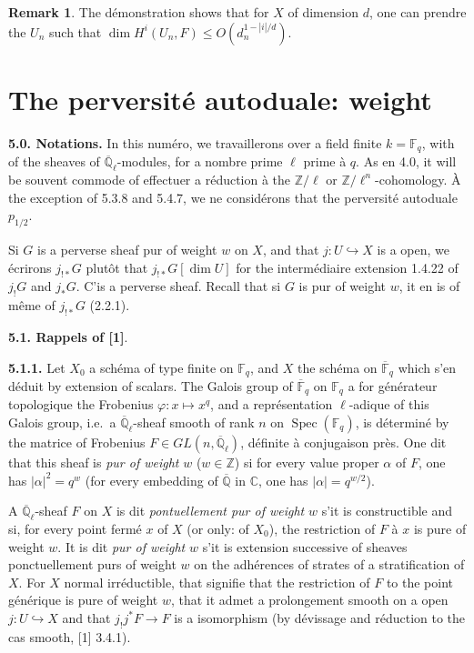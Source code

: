 \documentclass[12pt,a4paper]{article}
\theoremstyle{plain}
\theoremstyle{definition}
\newtheorem{remark}[theorem]{Remark}
\DeclareMathOperator{\Spec}{Spec}
\newcommand{\into}{\hookrightarrow}
\providecommand{\Spec}{\operatorname{Spec}}
\begin{document}
{{\begin{remark}\label{rem:4.5.6}
The d\'{e}monstration shows that for $X$ of dimension $d$, one can prendre the $U_{n}$ such that $\dim H^{i}(U_{n}, F) \leq O(d_{n}^{1-|i|/d})$.
\end{remark}


\section{The perversit\'{e} autoduale: weight}

\noindent\textbf{5.0. Notations.} In this num\'{e}ro, we travaillerons over a field finite $k = \mathbb{F}_{q}$, with of the sheaves of $\overline{\mathbb{Q}}_{\ell}$-modules, for a nombre prime $\ell$ prime \`{a} $q$. As en 4.0, it will be souvent commode of effectuer a r\'{e}duction \`{a} the $\mathbb{Z}/\ell$ or $\mathbb{Z}/\ell^{n}$-cohomology. \`{A} the exception of 5.3.8 and 5.4.7, we ne consid\'{e}rons that the perversit\'{e} autoduale $p_{1/2}$.

Si $G$ is a perverse sheaf pur of weight $w$ on $X$, and that $j: U \into X$ is a open, we \'{e}crirons $j_{!*}G$ plut\^{o}t that $j_{!*}G[\dim U]$ for the interm\'{e}diaire extension 1.4.22 of $j_{!}G$ and $j_{*}G$. C'is a perverse sheaf. Recall that si $G$ is pur of weight $w$, it en is of m\^{e}me of $j_{!*}G$ (2.2.1).

\noindent\textbf{5.1. Rappels of [1]}.

\noindent\textbf{5.1.1.} Let $X_{0}$ a sch\'{e}ma of type finite on $\mathbb{F}_{q}$, and $X$ the sch\'{e}ma on $\overline{\mathbb{F}}_{q}$ which s'en d\'{e}duit by extension of scalars. The Galois group of $\overline{\mathbb{F}}_{q}$ on $\mathbb{F}_{q}$ a for g\'{e}n\'{e}rateur topologique the Frobenius $\varphi: x \mapsto x^{q}$, and a repr\'{e}sentation $\ell$-adique of this Galois group, i.e.\ a $\overline{\mathbb{Q}}_{\ell}$-sheaf smooth of rank $n$ on $\Spec(\mathbb{F}_{q})$, is d\'{e}termin\'{e} by the matrice of Frobenius $F \in GL(n, \overline{\mathbb{Q}}_{\ell})$, d\'{e}finite \`{a} conjugaison pr\`{e}s. One dit that this sheaf is \emph{pur of weight} $w$ ($w \in \mathbb{Z}$) si for every value proper $\alpha$ of $F$, one has $|\alpha|^{2} = q^{w}$ (for every embedding of $\overline{\mathbb{Q}}$ in $\mathbb{C}$, one has $|\alpha| = q^{w/2}$).

A $\overline{\mathbb{Q}}_{\ell}$-sheaf $F$ on $X$ is dit \emph{pontuellement pur of weight} $w$ s'it is constructible and si, for every point ferm\'{e} $x$ of $X$ (or only: of $X_{0}$), the restriction of $F$ \`{a} $x$ is pure of weight $w$. It is dit \emph{pur of weight} $w$ s'it is extension successive of sheaves ponctuellement purs of weight $w$ on the adh\'{e}rences of strates of a stratification of $X$. For $X$ normal irr\'{e}ductible, that signifie that the restriction of $F$ to the point g\'{e}n\'{e}rique is pure of weight $w$, that it admet a prolongement smooth on a open $j: U \into X$ and that $j_{!}j^{*}F \to F$ is a isomorphism (by d\'{e}vissage and r\'{e}duction to the cas smooth, [1] 3.4.1).

}}
\end{document}

